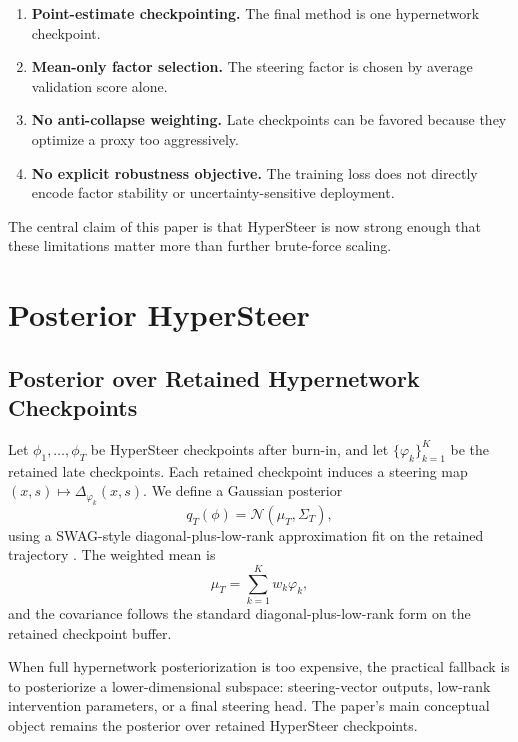 \documentclass[10pt]{article}
\begin{document}
\begin{enumerate}[leftmargin=1.5em]
  \item \textbf{Point-estimate checkpointing.} The final method is one hypernetwork checkpoint.
  \item \textbf{Mean-only factor selection.} The steering factor is chosen by average validation score alone.
  \item \textbf{No anti-collapse weighting.} Late checkpoints can be favored because they optimize a proxy too aggressively.
  \item \textbf{No explicit robustness objective.} The training loss does not directly encode factor stability or uncertainty-sensitive deployment.
\end{enumerate}

The central claim of this paper is that HyperSteer is now strong enough that these limitations matter more than further brute-force scaling.

\section{Posterior HyperSteer}

\subsection{Posterior over Retained Hypernetwork Checkpoints}

Let $\phi_1,\dots,\phi_T$ be HyperSteer checkpoints after burn-in, and let $\{\varphi_k\}_{k=1}^K$ be the retained late checkpoints. Each retained checkpoint induces a steering map $(x,s) \mapsto \Delta_{\varphi_k}(x,s)$. We define a Gaussian posterior
\begin{equation}
q_T(\phi) = \mathcal{N}(\mu_T,\Sigma_T),
\end{equation}
using a SWAG-style diagonal-plus-low-rank approximation fit on the retained trajectory \citep{maddox2019swag}. The weighted mean is
\begin{equation}
\mu_T = \sum_{k=1}^K w_k \varphi_k,
\end{equation}
and the covariance follows the standard diagonal-plus-low-rank form on the retained checkpoint buffer.

When full hypernetwork posteriorization is too expensive, the practical fallback is to posteriorize a lower-dimensional subspace: steering-vector outputs, low-rank intervention parameters, or a final steering head. The paper’s main conceptual object remains the posterior over retained HyperSteer checkpoints.
\end{document}
